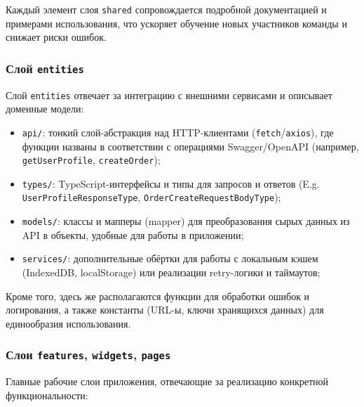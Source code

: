 Каждый элемент слоя \texttt{shared} сопровождается подробной документацией и примерами использования, что ускоряет обучение новых участников команды и снижает риски ошибок.

\subsubsection{Слой \texttt{entities}}

Слой \texttt{entities} отвечает за интеграцию с внешними сервисами и описывает доменные модели:

\begin{itemize}
	\item \texttt{api/}: тонкий слой-абстракция над HTTP-клиентами (\texttt{fetch}/\texttt{axios}), где функции названы в соответствии с операциями Swagger/OpenAPI (например, \texttt{getUserProfile}, \texttt{createOrder});
	\item \texttt{types/}: TypeScript-интерфейсы и типы для запросов и ответов (E.g. \texttt{UserProfileResponseType}, \texttt{OrderCreateRequestBodyType});
	\item \texttt{models/}: классы и мапперы (mapper) для преобразования сырых данных из API в объекты, удобные для работы в приложении;
	\item \texttt{services/}: дополнительные обёртки для работы с локальным кэшем (IndexedDB, localStorage) или реализации retry-логики и таймаутов;
\end{itemize}

Кроме того, здесь же располагаются функции для обработки ошибок и логирования, а также константы (URL-ы, ключи хранящихся данных) для единообразия использования.

\subsubsection{Слои \texttt{features}, \texttt{widgets}, \texttt{pages}}

Главные рабочие слои приложения, отвечающие за реализацию конкретной функциональности:

